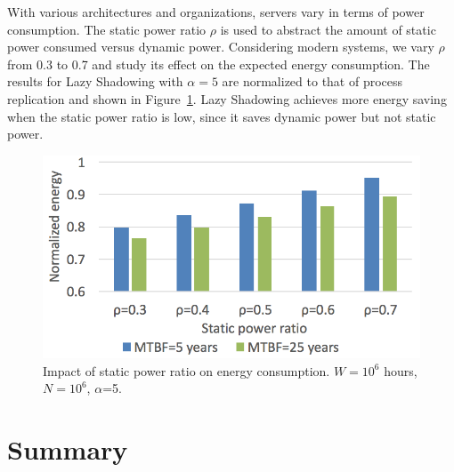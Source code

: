 With various architectures and organizations, servers
vary in terms of
power consumption. The static power ratio $\rho$ is used to abstract the
amount of static power consumed versus dynamic power. 
Considering modern systems, we vary $\rho$ from 0.3 to 0.7 and study its effect
on the expected energy consumption. The results for Lazy Shadowing with $\alpha=5$ are normalized to that of process replication and shown in 
Figure~\ref{fig:power_ratio}. 
Lazy Shadowing achieves
more energy saving when the static power ratio is low, since it saves dynamic 
power but not static power. %

\begin{figure}[!t]
	\captionsetup{justification=centering}
	\begin{center}
		\includegraphics[width=0.7\columnwidth]{figures/ts_power_5}
	\end{center}
	\caption{Impact of static power ratio on energy consumption. $W=10^6$ hours, $N=10^6$, $\alpha$=5.}
	\label{fig:power_ratio}
\end{figure}

\section{Summary}


